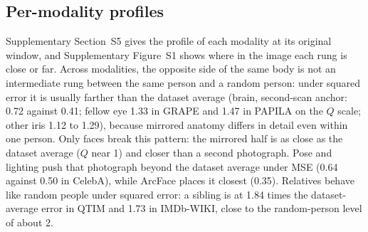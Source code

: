 \subsection{Per-modality profiles}
Supplementary Section~S5 gives the profile of each modality at its original window, and Supplementary Figure~S1 shows where in the image each rung is close or far.
Across modalities, the opposite side of the same body is not an intermediate rung between the same person and a random person: under squared error it is usually farther than the dataset average (brain, second-scan anchor: 0.72 against 0.41; fellow eye 1.33 in GRAPE and 1.47 in PAPILA on the $Q$ scale; other iris 1.12 to 1.29), because mirrored anatomy differs in detail even within one person\statuspre.
Only faces break this pattern: the mirrored half is as close as the dataset average ($Q$ near 1) and closer than a second photograph.
Pose and lighting push that photograph beyond the dataset average under \ac{MSE} (0.64 against 0.50 in CelebA), while ArcFace places it closest (0.35)\statusfinal.
Relatives behave like random people under squared error: a sibling is at 1.84 times the dataset-average error in QTIM and 1.73 in IMDb-WIKI, close to the random-person level of about 2\statuspre.
